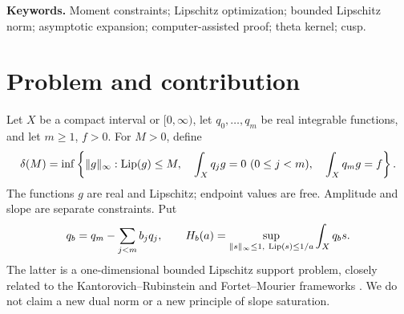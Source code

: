 \begin{abstract}
We study the least amplitude required to satisfy finitely many linear moment
conditions under a Lipschitz constraint. Starting from a sign certificate for the
unconstrained problem, we obtain a fourth-order expansion in the reciprocal slope
budget. Its coefficient contains a nonnegative quadratic correction caused by
the lower moment constraints. The result covers both finitely many switches on
a compact interval and countably many separated switches on the half-line, under
an explicit weighted summability condition. Examples show that the fourth-order
coefficient can have either sign, and that twice continuous differentiability
alone does not imply a fourth-order expansion. For a positive theta-kernel
family along a short, validated cusp branch, we give uniform, explicit
sixth-order error bounds. A weighted change of scale then proves strict ordering
of the actual optimal values for every pair of distinct branch parameters,
including arbitrarily close pairs. The numerical claims are accompanied by
interval certificates and reproducible checks. This preprint is prepared for
independent mathematical review; neither a formal verification nor an external
referee report is claimed.
\end{abstract}

\noindent\textbf{Keywords.} Moment constraints; Lipschitz optimization;
bounded Lipschitz norm; asymptotic expansion; computer-assisted proof;
theta kernel; cusp.

\section{Problem and contribution}
Let \(X\) be a compact interval or \([0,\infty)\), let
\(q_0,\ldots,q_m\) be real integrable functions, and let \(m\geq1\), \(f>0\).
For \(M>0\), define
\begin{equation}\label{eq:problem}
 \delta(M)=\inf\left\{\lVert g\rVert_\infty:
 \operatorname{Lip}(g)\leq M,\quad
 \int_Xq_jg=0\ (0\leq j<m),\quad \int_Xq_mg=f\right\}.
\end{equation}
The functions \(g\) are real and Lipschitz; endpoint values are free.
Amplitude and slope are separate constraints. Put
\[
 q_b=q_m-\sum_{j<m}b_jq_j,\qquad
 H_b(a)=\sup_{\lVert s\rVert_\infty\leq1,\ \operatorname{Lip}(s)\leq1/a}\int_Xq_bs.
\]
The latter is a one-dimensional bounded Lipschitz support problem, closely
related to the Kantorovich--Rubinstein and Fortet--Mourier frameworks
\cite{lellmann,hille2023,hille2024}. We do not claim a new dual norm or a new
principle of slope saturation.

